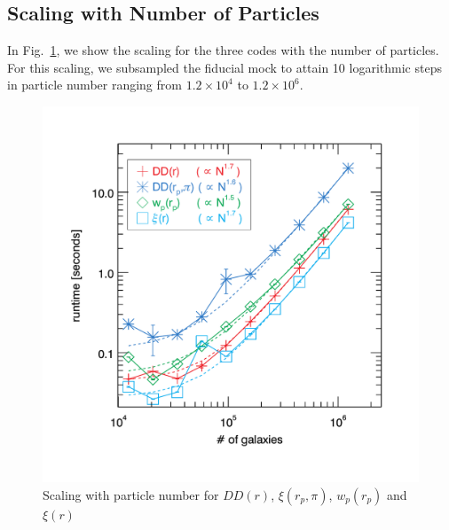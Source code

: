 \documentclass[preprint,authoryear,12pt]{elsarticle}
\newcommand{\xir}{\ensuremath{{DD(r)}}\xspace}
\newcommand{\xiofr}{\ensuremath{{\xi(r)}}\xspace}
\newcommand{\wprp}{\ensuremath{{w_p(r_p)}}\xspace}
\newcommand{\xirppi}{\ensuremath{{\xi(r_p,\pi)}}\xspace}
\begin{document}
\subsection{Scaling with Number of Particles}
In Fig.~\ref{fig:scaling_numpart}, we show the scaling for the three codes with the number of particles. For this scaling, we subsampled 
the fiducial mock to attain 10 logarithmic steps in particle number ranging from $1.2\times10^4$ to $1.2\times10^6$. 

\begin{figure}[htbp]
\includegraphics[clip=true,width=\linewidth]{timings_Mr19_numpart}%
\caption{Scaling with particle number for \xir, \xirppi, \wprp and \xiofr}
\label{fig:scaling_numpart}
\end{figure}
\end{document}
